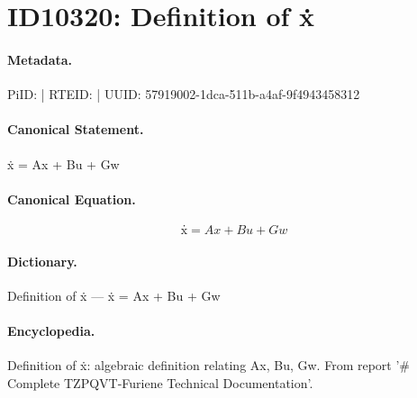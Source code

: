 \section*{ID10320: Definition of ẋ}
\paragraph{Metadata.}
PiID:  | RTEID:  | UUID: 57919002-1dca-511b-a4af-9f4943458312

\paragraph{Canonical Statement.}
ẋ = Ax + Bu + Gw

\paragraph{Canonical Equation.}
\[
ẋ = Ax + Bu + Gw
\]

\paragraph{Dictionary.}
Definition of ẋ — ẋ = Ax + Bu + Gw

\paragraph{Encyclopedia.}
Definition of ẋ: algebraic definition relating Ax, Bu, Gw. From report '\# Complete TZPQVT-Furiene Technical Documentation'.

